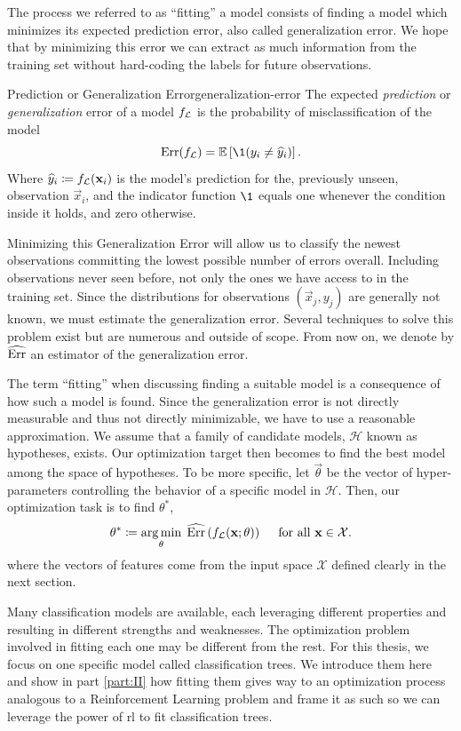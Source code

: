 The process we referred to as ``fitting'' a model consists of finding a model
which minimizes its expected prediction error, also called generalization error.
We hope that by minimizing this error we can extract as much information from
the training set without hard-coding the labels for future observations.

\begin{dfn}{Prediction or Generalization Error}{generalization-error}
    The expected \emph{prediction} or \emph{generalization} error of a model
    $f_{\mathcal{L}}$ is the probability of misclassification of the model
    \[
        \Err (f_\L) = \mathbb{E} \left[ \1 (y_i \neq \widehat{y}_i)  \right].
    \]
    Where $\widehat{y}_i \coloneqq f_{\mathcal{L}} (\mathbf{x}_i)$ is the model's prediction
    for the, previously unseen, observation $\vec{x}_i$, and the indicator
    function $\1$ equals one whenever the condition inside it holds, and zero
    otherwise.
\end{dfn}

Minimizing this Generalization Error will allow us to classify the newest
observations committing the lowest possible number of errors overall.
Including observations never seen before, not only the ones we have access to in
the training set. Since the distributions for observations $(\vec{x}_j, y_j)$
are generally not known, we must estimate the generalization error. Several
techniques to solve this problem exist but are numerous and outside of scope.
From now on, we denote by $\widehat{\operatorname*{Err}}$ an estimator of the generalization
error.

The term ``fitting'' when discussing finding a suitable model is a consequence
of how such a model is found. Since the generalization error is not directly
measurable and thus not directly minimizable, we have to use a reasonable
approximation. We assume that a family of candidate models, $\mathcal{H}$ known
as hypotheses, exists. Our optimization target then becomes to find the best
model among the space of hypotheses. To be more specific, let $\vec{\theta}$ be
the vector of hyper-parameters controlling the behavior of a specific model in
$\mathcal{H}$.  Then, our optimization task is to find $\theta^{*}$,
\[
    \theta^{*} \coloneqq \operatorname*{arg\,min}_{\theta} \; \widehat{\operatorname*{Err}}\left(f_{\mathcal{L}} (\mathbf{x}; \theta) \right) \quad \text{ for all } \mathbf{x} \in \mathcal{X}.
\]
where the vectors of features come from the input space $\mathcal{X}$ defined
clearly in the next section.

Many classification models are available, each leveraging different properties
and resulting in different strengths and weaknesses. The optimization problem
involved in fitting each one may be different from the rest. For this thesis, we
focus on one specific model called classification trees. We introduce them here
and show in part \ref{part:II} how fitting them gives way to an optimization
process analogous to a Reinforcement Learning problem and frame it as such so we
can leverage the power of \ac{rl} to fit classification trees.

